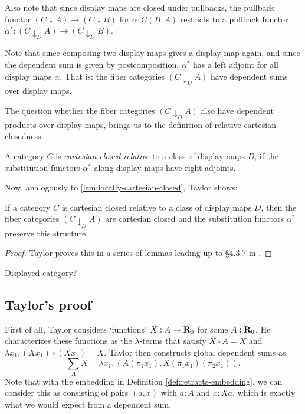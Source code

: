 Also note that since display maps are closed under pullbacks, the pullback functor $ (C \downarrow A) \to (C \downarrow B) $ for $ \alpha: C(B, A) $ restricts to a pullback functor $ \alpha^*: (C \downarrow_D A) \to (C \downarrow_D B) $.

Note that since composing two display maps gives a display map again, and since the dependent sum is given by postcomposition, $ \alpha^* $ has a left adjoint for all display maps $ \alpha $. That is: the fiber categories $ (C \downarrow_D A) $ have dependent sums over display maps.

The question whether the fiber categories $ (C \downarrow_D A) $ also have dependent products over display maps, brings us to the definition of relative cartesian closedness.
\begin{definition}
  A category $ C $ is \textit{cartesian closed relative} to a class of display maps $ D $, if the substitution functors $ \alpha^* $ along display maps have right adjoints.
\end{definition}

Now, analogously to \ref{lem:locally-cartesian-closed}, Taylor shows:
\begin{lemma}
  If a category $ C $ is cartesian closed relative to a class of display maps $ D $, then the fiber categories $ (C \downarrow_D A) $ are cartesian closed and the substitution functors $ \alpha^* $ preserve this structure.
\end{lemma}
\begin{proof}
  Taylor proves this in a series of lemmas leading up to \S 4.3.7 in \cite{taylor}.
\end{proof}

\TODO Displayed category?

\subsection{Taylor's proof}

First of all, Taylor considers `functions' $ X: A \to \mathbf{R}_0 $ for some $ A : \mathbf{R}_0 $. He characterizes these functions as the $ \lambda $-terms that satisfy $ X \circ A = X $ and $ \lambda x_1, (X x_1) \circ (X x_1) = X $. Taylor then constructs global dependent sums as
\[ \sum_A X = \lambda x_1, (A (\pi_1 x_1), X (\pi_1 x_1) (\pi_2 x_1)). \]
Note that with the embedding in Definition \ref{def:retracts-embedding}, we can consider this as consisting of pairs $ (a, x) $ with $ a : A $ and $ x : X a $, which is exactly what we would expect from a dependent sum.

